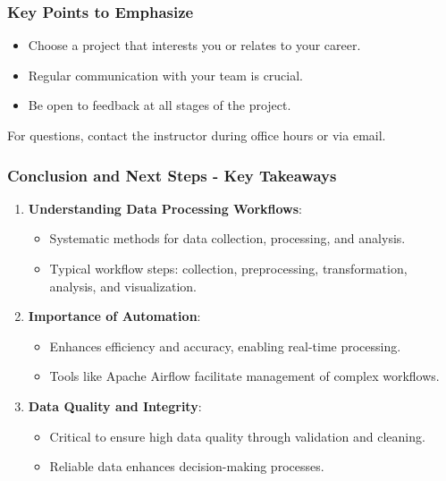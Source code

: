 \documentclass[aspectratio=169]{beamer}
\begin{document}
\begin{frame}[fragile]
    \frametitle{Key Points to Emphasize}
    \begin{itemize}
        \item Choose a project that interests you or relates to your career.
        \item Regular communication with your team is crucial.
        \item Be open to feedback at all stages of the project.
    \end{itemize}
     For questions, contact the instructor during office hours or via email.
\end{frame}

\begin{frame}[fragile]
    \frametitle{Conclusion and Next Steps - Key Takeaways}
    \begin{enumerate}
        \item \textbf{Understanding Data Processing Workflows}:
        \begin{itemize}
            \item Systematic methods for data collection, processing, and analysis.
            \item Typical workflow steps: collection, preprocessing, transformation, analysis, and visualization.
        \end{itemize}
        
        \item \textbf{Importance of Automation}:
        \begin{itemize}
            \item Enhances efficiency and accuracy, enabling real-time processing.
            \item Tools like Apache Airflow facilitate management of complex workflows.
        \end{itemize}
        
        \item \textbf{Data Quality and Integrity}:
        \begin{itemize}
            \item Critical to ensure high data quality through validation and cleaning.
            \item Reliable data enhances decision-making processes.
        \end{itemize}
    \end{enumerate}
\end{frame}
\end{document}
